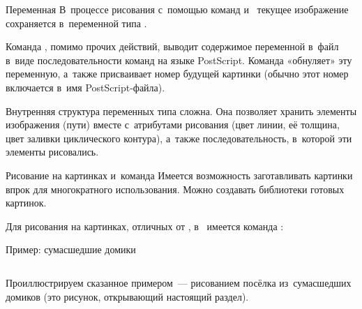 	{}


\begin{frame}{Переменная }
В~процессе рисования с~помощью команд  и~ текущее
изображение сохраняется в~переменной  типа
.

Команда , помимо прочих действий, выводит содержимое переменной
 в~файл в~виде последовательности команд на языке
PostScript. Команда  «обнуляет» эту переменную, а~также
присваивает номер будущей картинки (обычно этот номер включается в~имя
PostScript-файла).

Внутренняя структура переменных типа  сложна. Она позволяет
хранить элементы изображения (пути) вместе с~атрибутами рисования (цвет линии,
её толщина, цвет заливки циклического контура), а~также последовательность,
в~которой эти элементы рисовались.
\end{frame}


\begin{frame}{Рисование на картинках и~команда }
Имеется возможность заготавливать картинки впрок для многократного
использования. Можно создавать библиотеки готовых картинок.

Для рисования на картинках, отличных от ,
в~ имеется команда :
\begin{center}
%
%
%
\end{center}
\end{frame}


\begin{frame}{Пример: сумасшедшие домики}
\begin{columns}
Проиллюстрируем сказанное примером~— рисованием посёлка из~сумасшедших домиков
(это рисунок, открывающий настоящий раздел).

\centerline{}
\end{columns}
\end{frame}

